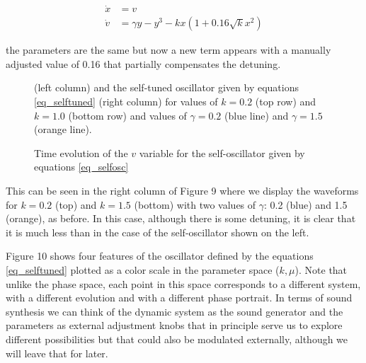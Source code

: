 \documentclass{article}
\begin{document}
\begin{subequations} \label{eq_selftuned}
\begin{align}
    \dot{x} & = v \\
    \dot{v} & = \gamma y - y^3 -kx(1+0.16\sqrt{k}x^2)
\end{align}
\end{subequations}

the parameters are the same but now a new term appears with a manually adjusted value of 0.16 that partially compensates the detuning. 

\begin{figure}[h]
    \centering
    \caption{Time evolution of the $v$ variable for the self-oscillator given by equations \ref{eq_selfosc}} (left column) and the self-tuned oscillator given by equations \ref{eq_selftuned} (right column) for values of $k=0.2$ (top row) and $k=1.0$ (bottom row) and values of $\gamma=0.2$ (blue line) and $\gamma=1.5$ (orange line). 
    \label{fig_selftunedosc}
\end{figure}

This can be seen in the right column of Figure 9 where we display the waveforms for $k=0.2$ (top) and $k=1.5$ (bottom) with two values of $\gamma$: 0.2 (blue) and 1.5 (orange), as before. 
In this case, although there is some detuning, it is clear that it is much less than in the case of the self-oscillator shown on the left.

Figure 10 shows four features of the oscillator defined by the equations \ref{eq_selftuned} plotted as a color scale in the parameter space ($k,\mu$). 
Note that unlike the phase space, each point in this space corresponds to a different system, with a different evolution and with a different phase portrait. 
In terms of sound synthesis we can think of the dynamic system as the sound generator and the parameters as external adjustment knobs that in principle serve us to explore different possibilities but that could also be modulated externally, although we will leave that for later.
\end{document}
